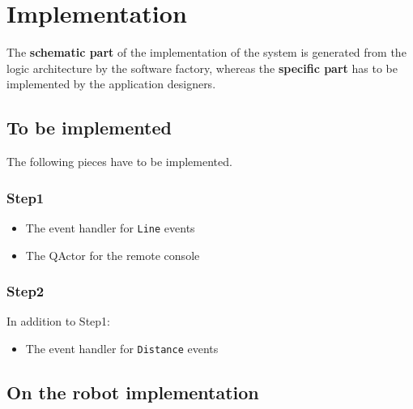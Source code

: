 \documentclass[11pt]{article}
\newcommand{\labelsec}[1]{\label{sec:#1}}
\begin{document}
\section{Implementation}
\labelsec{Implementation}

The \textbf{schematic part} of the implementation of the system is generated 
from the logic architecture by the software factory, whereas the
\textbf{specific part} has to be implemented by the application designers.

\subsection{To be implemented}

The following pieces have to be implemented.

\subsubsection{Step1}


\begin{itemize}
  \item The event handler for \texttt{Line} events
  \item The QActor for the remote console
\end{itemize}

\subsubsection{Step2}

In addition to Step1:

\begin{itemize}
  \item The event handler for \texttt{Distance} events
\end{itemize}





\subsection{On the robot implementation}
\end{document}
